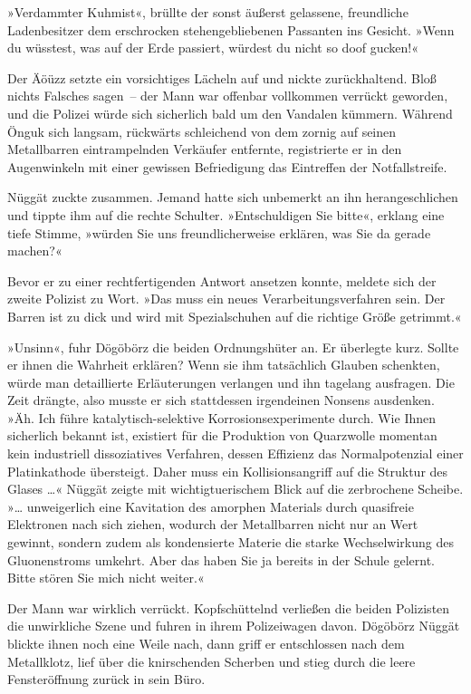 »Verdammter Kuhmist«, brüllte der sonst äußerst gelassene, freundliche Ladenbesitzer dem erschrocken stehengebliebenen Passanten ins Gesicht. »Wenn du wüsstest, was auf der Erde passiert, würdest du nicht so doof gucken!«

Der Äöüzz setzte ein vorsichtiges Lächeln auf und nickte zurückhaltend. Bloß nichts Falsches sagen~– der Mann war offenbar vollkommen verrückt geworden, und die Polizei würde sich sicherlich bald um den Vandalen kümmern. Während Önguk sich langsam, rückwärts schleichend von dem zornig auf seinen Metallbarren eintrampelnden Verkäufer entfernte, registrierte er in den Augenwinkeln mit einer gewissen Befriedigung das Eintreffen der Notfallstreife.

Nüggät zuckte zusammen. Jemand hatte sich unbemerkt an ihn herangeschlichen und tippte ihm auf die rechte Schulter. »Entschuldigen Sie bitte«, erklang eine tiefe Stimme, »würden Sie uns freundlicherweise erklären, was Sie da gerade machen?«

Bevor er zu einer rechtfertigenden Antwort ansetzen konnte, meldete sich der zweite Polizist zu Wort. »Das muss ein neues Verarbeitungsverfahren sein. Der Barren ist zu dick und wird mit Spezialschuhen auf die richtige Größe getrimmt.«

»Unsinn«, fuhr Dögöbörz die beiden Ordnungshüter an. Er überlegte kurz. Sollte er ihnen die Wahrheit erklären? Wenn sie ihm tatsächlich Glauben schenkten, würde man detaillierte Erläuterungen verlangen und ihn tagelang ausfragen. Die Zeit drängte, also musste er sich stattdessen irgendeinen Nonsens ausdenken. »Äh. Ich führe katalytisch-selektive Korrosionsexperimente durch. Wie Ihnen sicherlich bekannt ist, existiert für die Produktion von Quarzwolle momentan kein industriell dissoziatives Verfahren, dessen Effizienz das Normalpotenzial einer Platinkathode übersteigt. Daher muss ein Kollisionsangriff auf die Struktur des Glases …« Nüggät zeigte mit wichtigtuerischem Blick auf die zerbrochene Scheibe. »… unweigerlich eine Kavitation des amorphen Materials durch quasifreie Elektronen nach sich ziehen, wodurch der Metallbarren nicht nur an Wert gewinnt, sondern zudem als kondensierte Materie die starke Wechselwirkung des Gluonenstroms umkehrt. Aber das haben Sie ja bereits in der Schule gelernt. Bitte stören Sie mich nicht weiter.«

Der Mann war wirklich verrückt. Kopfschüttelnd verließen die beiden Polizisten die unwirkliche Szene und fuhren in ihrem Polizeiwagen davon. Dögöbörz Nüggät blickte ihnen noch eine Weile nach, dann griff er entschlossen nach dem Metallklotz, lief über die knirschenden Scherben und stieg durch die leere Fensteröffnung zurück in sein Büro.

